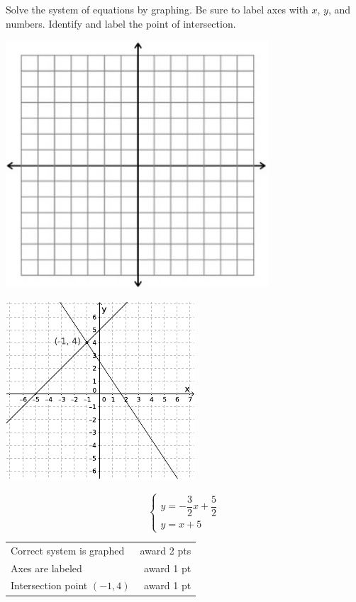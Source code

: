 {
	Solve the system of equations by graphing. Be sure to label axes with $x$, $y$, and numbers. Identify and label the point of intersection. \begin{onlyproblem}\begin{center}\includegraphics{fig-graphpaper.png}\end{center}\end{onlyproblem} \begin{onlysolution}\begin{center}\includegraphics{fig095-10-5-a-answer}\end{center}\end{onlysolution}
	$$\begin{cases} y=-\dfrac{3}{2}x+\dfrac{5}{2}\\ y=x+5\end{cases}$$
}
{
	\begin{tabular}{l r}
	Correct system is graphed & award 2 pts\\
	Axes are labeled & award 1 pt\\
	Intersection point $(-1,4)$ & award 1 pt
	\end{tabular}
}

